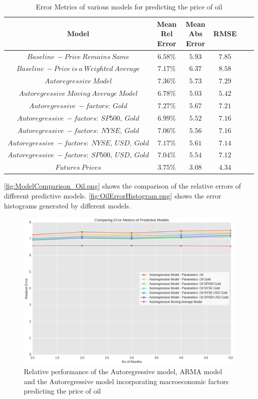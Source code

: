 \documentclass[runningheads]{llncs}
\begin{document}
\begin{table}
\begin{center}
\begin{tabular}{|c|c|c|c|c|c}
\hline
\textbf{Model} & \textbf{Mean Rel Error} & \textbf{Mean Abs Error} & \textbf{RMSE} \\ \hline \hline$ Baseline\ - Price\ Remains\ Same$ & $6.58\%$ & $5.93$ & $7.85$ \\ \hline
$ Baseline\ - Price\ is\ a\ Weighted\ Average$ & $7.17\%$ & $6.37$ & $8.58$ \\ \hline\hline
$ Autoregressive\ Model $ & $7.36\%$ & $5.73$ & $7.29$\\ \hline
$ Autoregressive\ Moving\ Average\ Model $ & $6.78\%$ & $5.03$ & $5.42$ \\ \hline\hline
$ Autoregressive\ - factors:\ Gold $ & $7.27\%$ & $5.67$ & $7.21$ \\ \hline
$ Autoregressive\ - factors:\ SP500,\ Gold $ & $6.99\%$ & $5.52$ & $7.16$ \\ \hline
$ Autoregressive\ - factors:\ NYSE,\ Gold $ & $7.06\%$ & $5.56$ & $7.16$ \\ \hline
$ Autoregressive\ - factors:\ NYSE,\ USD,\ Gold $ & $7.17\%$ & $5.61$ & $7.14$ \\ \hline
$ Autoregressive\ - factors:\ SP500,\ USD,\ Gold $ & $7.04\%$ & $5.54$ & $7.12$ \\ \hline\hline
$ Futures\ Prices $ & $3.75\%$ & $3.08$ & $4.34$ \\ \hline
\end{tabular}
\end{center} 
\caption{Error Metrics of various models for predicting the price of oil}
\end{table} 


\autoref{fig:ModelComparison_Oil.png} shows the comparison of the relative errors of different predictive models. \autoref{fig:OilErrorHistogram.png} shows the error histograms generated by different models.

\begin{figure}
\centering
\includegraphics[width=\textwidth]{ModelComparison_Oil.png}
\caption{Relative performance of the Autoregressive model, ARMA model and the Autoregressive model incorporating macroeconomic factors predicting the price of oil}
\label{fig:ModelComparison_Oil.png}
\end{figure}
\end{document}
